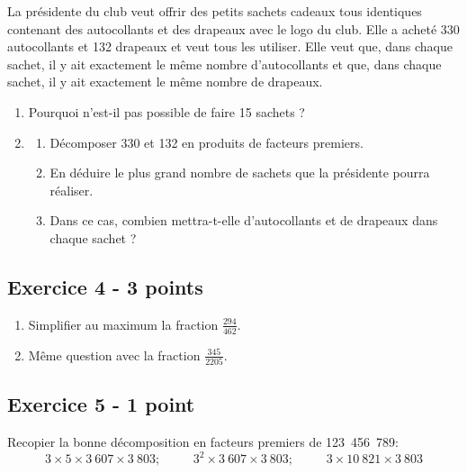 \documentclass[14 pt]{extarticle}
\theoremstyle{plain}
\begin{document}
La présidente du club veut offrir des petits sachets cadeaux tous identiques contenant des autocollants et des drapeaux avec le logo du club. Elle a acheté 330 autocollants et 132 drapeaux et veut tous les utiliser. Elle veut que, dans chaque sachet, il y ait exactement le même nombre d'autocollants et que, dans chaque sachet, il y ait exactement le même nombre de drapeaux.

\medskip

\begin{enumerate}
\item Pourquoi n'est-il pas possible de faire 15 sachets ?
\item 
	\begin{enumerate}
		\item Décomposer 330 et 132 en produits de facteurs premiers.
		\item En déduire le plus grand nombre de sachets que la présidente pourra réaliser.
		\item Dans ce cas, combien mettra-t-elle d'autocollants et de drapeaux dans chaque sachet ?
	\end{enumerate}
\end{enumerate}
 
 \subsection*{Exercice 4 - 3 points}
 \begin{enumerate}
 \item 
 Simplifier au maximum la fraction $\frac{294}{462}$.
 \item 
 Même question avec la fraction $\frac{345}{2205}$.
 \end{enumerate}
 \subsection*{Exercice 5 - 1 point}
  Recopier la bonne décomposition en facteurs premiers de 123~456~789: 
  \[ 3\times5\times 3~607\times 3~803 ;\phantom{meow} 3^2\times 3~607\times 3~803 ;\phantom{meow} 3\times 10~821\times 3~803 \]
 
 	
\end{document}
